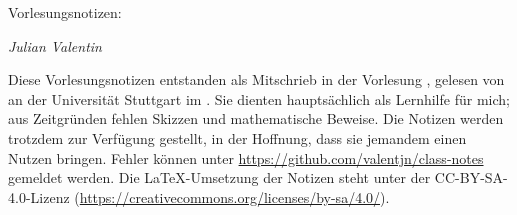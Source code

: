 

\ihead{\vorlesung{}}
\ifoot{\vspace{-1.5mm}\headmark}

\thispagestyle{empty}
\vspace*{1em}

{%
  \huge%
  Vorlesungsnotizen: \vorlesung{}%
}
\vspace*{1em}

\emph{Julian Valentin}

\vspace*{1em}

Diese Vorlesungsnotizen entstanden als Mitschrieb in der Vorlesung \vorlesung{},
gelesen von \dozent{} an der Universität Stuttgart im \semester{}.
Sie dienten hauptsächlich als Lernhilfe für mich;
aus Zeitgründen fehlen Skizzen und mathematische Beweise.
Die Notizen werden trotzdem zur Verfügung gestellt, in der Hoffnung,
dass sie jemandem einen Nutzen bringen.
Fehler können unter \url{https://github.com/valentjn/class-notes} gemeldet werden.
Die \LaTeX{}-Umsetzung der Notizen steht unter der CC-BY-SA-4.0-Lizenz
(\url{https://creativecommons.org/licenses/by-sa/4.0/}).

{%
  \renewcommand*{\chaptermarkformat}{}

  \tableofcontents%
}

\pagebreak


